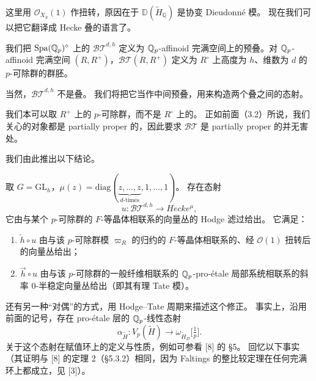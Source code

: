 这里用 $\mathcal{O}_{X_S}(1)$ 作扭转，原因在于 $\mathbb{D}(\widetilde{H}_{\mathbb{Q}})$ 是协变 Dieudonné 模。
现在我们可以把它翻译成 Hecke 叠的语言了。

\begin{definition}
我们把 $\mathrm{Spa}(\mathbb{Q}_p)^\diamond$ 上的 $\mathcal{BT}^{d,h}$ 定义为 $\mathbb{Q}_p$-affinoid 完满空间上的预叠。对 $\mathbb{Q}_p$-affinoid 完满空间 $(R,R^+)$，$\mathcal{BT}(R,R^+)$ 定义为 $R^\circ$ 上高度为 $h$、维数为 $d$ 的 $p$-可除群的群胚。
\end{definition}

当然，$\mathcal{BT}^{d,h}$ 不是叠。
我们将把它当作中间预叠，用来构造两个叠之间的态射。

\begin{remark}
我们本可以取 $R^+$ 上的 $p$-可除群，而不是 $R^\circ$ 上的。
正如前面（3.2）所说，我们关心的对象都是 partially proper 的，因此要求 $\mathcal{BT}$ 是 partially proper 的并无害处。
\end{remark}

我们由此推出以下结论。

\begin{corollary}
取 $G=\mathrm{GL}_h$，$\mu(z)=\mathrm{diag}(\underbrace{z,\dots,z}_{d\text{-times}},1,\dots,1)$。
存在态射
\[
u:\mathcal{BT}^{d,h}\longrightarrow Hecke^\mu,
\]
它由与某个 $p$-可除群的 $F$-等晶体相联系的向量丛的 Hodge 滤过给出。
它满足：
\begin{enumerate}
\item[(1)] $\overleftarrow{h}\circ u$ 由与该 $p$-可除群模 $\varpi_R$ 的归约的 $F$-等晶体相联系的、经 $\mathcal{O}(1)$ 扭转后的向量丛给出；
\item[(2)] $\overrightarrow{h}\circ u$ 由与该 $p$-可除群的一般纤维相联系的 $\mathbb{Q}_p$-pro-étale 局部系统相联系的斜率 $0$-半稳定向量丛给出（即其有理 Tate 模）。
\end{enumerate}
\end{corollary}

还有另一种“对偶”的方式，用 Hodge--Tate 周期来描述这个修正。
事实上，沿用前面的记号，存在 pro-étale 层的 $\mathbb{Q}_p$-线性态射
\[
\alpha_{\widetilde{H}}:V_p(\widetilde{H})\longrightarrow\omega_{\widetilde{H}_D}\bigl[\tfrac1p\bigr].
\]
关于这个态射在赋值环上的定义与性质，例如可参看 [8] 的 §5。
回忆以下事实（其证明与 [8] 的定理 2（§5.3.2）相同，因为 Faltings 的整比较定理在任何完满环上都成立，见 [3]）。

